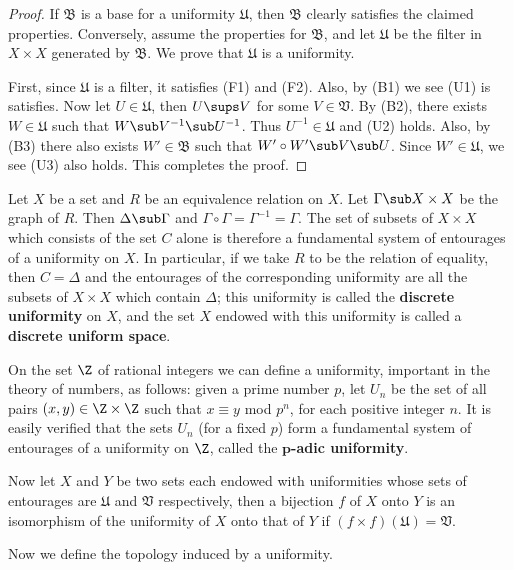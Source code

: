\begin{proof}
If $\mathfrak{B}$ is a base for a uniformity $\mathfrak{U}$, then $\mathfrak{B}$ clearly satisfies the claimed properties. Conversely, assume the properties for $\mathfrak{B}$, and let $\mathfrak{U}$ be the filter in $X\times X$ generated by $\mathfrak{B}$. We prove that $\mathfrak{U}$ is a uniformity.\par
First, since $\mathfrak{U}$ is a filter, it satisfies (F1) and (F2). Also, by (B1) we see (U1) is satisfies. Now let $U\in\mathfrak{U}$, then $U\sups V$ for some $V\in\mathfrak{V}$. By (B2), there exists $W\in\mathfrak{U}$ such that $W\sub V^{-1}\sub U^{-1}$. Thus $U^{-1}\in\mathfrak{U}$ and (U2) holds. Also, by (B3) there also exists $W'\in\mathfrak{B}$ such that $W'\circ W'\sub V\sub U$. Since $W'\in\mathfrak{U}$, we see (U3) also holds. This completes the proof.
\end{proof}
\begin{example}
Let $X$ be a set and $R$ be an equivalence relation on $X$. Let $\Gamma\sub X\times X$ be the graph of $R$. Then $\Delta\sub\Gamma$ and $\Gamma\circ\Gamma=\Gamma^{-1}=\Gamma$. The set of subsets of $X\times X$ which consists of the set $C$ alone is therefore a fundamental system of entourages of a uniformity on $X$. In particular, if we take $R$ to be the relation of equality, then $C=\Delta$ and the entourages of the corresponding uniformity are all the subsets of $X\times X$ which contain $\Delta$; this uniformity is called the \textbf{discrete uniformity} on $X$, and the set $X$ endowed with this uniformity is called a \textbf{discrete uniform space}.
\end{example}
\begin{example}
On the set $\Z$ of rational integers we can define a uniformity, important in the theory of numbers, as follows: given a prime number $p$, let $U_n$ be the set of all pairs $(x,y)\in\Z\times\Z$ such that $x\equiv y$ mod $p^n$, for each positive integer $n$. It is easily verified that the sets $U_n$ (for a fixed $p$) form a fundamental system of entourages of a uniformity on $\Z$, called the \textbf{$\bm{p}$-adic uniformity}.
\end{example}
Now let $X$ and $Y$ be two sets each endowed with uniformities whose sets of entourages are $\mathfrak{U}$ and $\mathfrak{V}$ respectively, then a bijection $f$ of $X$ onto $Y$ is an isomorphism of the uniformity of $X$ onto that of $Y$ if $(f\times f)(\mathfrak{U})=\mathfrak{V}$.\par
Now we define the topology induced by a uniformity.
